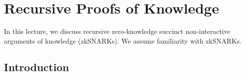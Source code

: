 \newcommand{\niksdef}[6]{
For all expected polynomial-time adversaries 
$\mathcal{P}^*$ 
there exists an expected polynomial-time extractor
$\mathcal{E}$ such that
    \[
    \Pr_{\mathsf{r}}
    \left[
      \begin{array}{l}
        #6
      \end{array}
      \middle\vert
      \begin{array}{l}
        \mathsf{pp} \gets \mathcal{G}(1^{\lambda}, N),\\ 
        (#1, #2, #4) \gets \mathcal{P}^*(\mathsf{pp}, \mathsf{r}),\\
        (\pk, \vk) \gets \En(\pp, #1),\\
        #5,\\
        #3 \gets \mathcal{E}(\pp, \mathsf{r})
      \end{array}
    \right]
    \approx 
    1
    \]
    where $\mathsf{r}$ denotes an arbitrarily long random tape.
}




\newcommand{\FP}{F'}
\newcommand{\io}{\mathsf{x}}
\newcommand{\fu}{\mathsf{u}}
\newcommand{\fw}{\mathsf{w}}
\newcommand{\acc}{\mathsf{U}}
\newcommand{\aw}{\mathsf{W}}
\newcommand{\trivi}{\fu_{\bot}}
\newcommand{\trivw}{\fw_{\bot}}
\newcommand{\fold}{\mathsf{NIFS}}
\newcommand{\snark}{\mathsf{SNARK}}
\newcommand{\RIVC}{\R_{\mathsf{IVC}}}
\newcommand{\Str}{\mathsf{s}}
\newcommand{\com}{\mathsf{com}}

\newcommand{\Commit}{\mathsf{Commit}}


\section{Recursive Proofs of Knowledge}

In this lecture, 
we discuss recursive zero-knowledge succinct non-interactive
arguments of knowledge (zkSNARKs).
%
We assume familiarity with zkSNARKs.

\subsection{Introduction}

